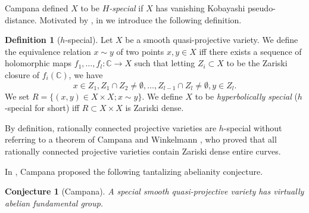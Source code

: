 \documentclass[english]{amsproc}
\theoremstyle{plain}
\newtheorem{lem}[thm]{Lemma}
\newtheorem{proposition}[thm]{Proposition}
\newtheorem{conjecture}[thm]{Conjecture}
\theoremstyle{definition}
\newtheorem{dfn}[thm]{Definition}
\theoremstyle{remark}
\theoremstyle{plain}
\numberwithin{equation}{thm} %
\begin{document}
	Campana defined $X$ to be \emph{$H$-special} if $X$ has vanishing Kobayashi pseudo-distance.
	Motivated by \cite[11.3 (5)]{Cam11}, in \cite[Definition 2.2]{CDY25b} we introduce the following definition. 
	\begin{dfn}[$h$-special]\label{defn:20230407}
		Let $X$ be a smooth quasi-projective variety.
		We define the equivalence relation $x\sim y$ of two points $x,y\in X$ iff there exists a sequence of holomorphic maps $f_1,\ldots,f_l:\mathbb C\to X$ such that letting $Z_i\subset X$ to be the Zariski closure of $f_i(\mathbb C)$, we have 
		$$x\in Z_1, Z_1\cap Z_2\not=\emptyset, \ldots, Z_{l-1}\cap Z_l\not=\emptyset, y\in Z_l.$$
		We set $R=\{ (x,y)\in X\times X; x\sim y\}$.
		We define $X$ to be \emph{hyperbolically special} ($h$-special for short) iff $R\subset X\times X$ is Zariski dense.
	\end{dfn} 
	By definition, rationally connected projective varieties are $h$-special without referring to a theorem of Campana and Winkelmann \cite{CW16}, who proved that all rationally connected projective varieties contain Zariski dense entire curves. %
	
	In \cite{Cam04,Cam11}, Campana proposed the following tantalizing abelianity conjecture. 
	\begin{conjecture}[Campana]\label{conj:Campana}
		A special   smooth quasi-projective variety has virtually abelian fundamental group. 
	\end{conjecture}
	
\end{document}
